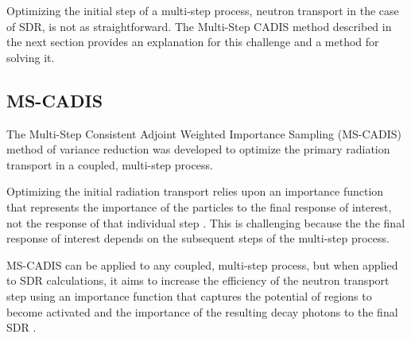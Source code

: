 Optimizing the initial step of a multi-step process, neutron transport in the case of SDR, is not as
straightforward.
The Multi-Step CADIS method described in the next section 
provides an explanation for this challenge and a method for solving it.

\subsection{MS-CADIS}\label{sec:mscadis}
The Multi-Step Consistent Adjoint Weighted Importance Sampling (MS-CADIS)
method of variance reduction 
was developed to optimize the primary radiation transport
in a coupled, multi-step process.

Optimizing the initial radiation transport
relies upon
an importance function that represents the importance of the particles to the
final response of interest, not the response of that individual step \cite{mscadis}.  
This is challenging because the the final response of interest depends on the subsequent 
steps of the multi-step process.

MS-CADIS can be applied to any coupled, multi-step process, but when applied to
SDR calculations, it aims to increase the efficiency of the neutron transport step
using an importance function that captures the potential of regions to become 
activated and the importance of the resulting decay photons to the final SDR \cite{mscadis}.

